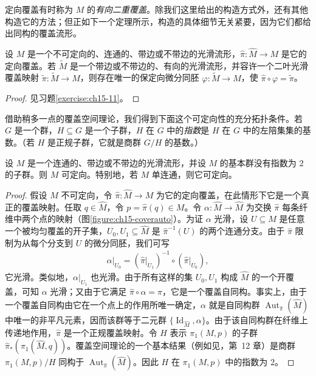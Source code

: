 \documentclass[../../main.tex]{subfiles}
\begin{document}
定向覆盖有时称为 $M$ 的\emph{有向二重覆盖}。除我们这里给出的构造方式外，还有其他构造它的方法；但正如下一个定理所示，构造的具体细节无关紧要，因为它们都给出同构的覆盖流形。

\begin{theorem}[定向覆盖的唯一性]\label{theorem:ch15-covering-uniqueness}
设 $M$ 是一个不可定向的、连通的、带边或不带边的光滑流形，$\widehat\pi:\widehat M\to M$ 是它的定向覆盖。若 $\widetilde M$ 是一个带边或不带边的、有向的光滑流形，并容许一个二叶光滑覆盖映射 $\widetilde\pi:\widetilde M\to M$，则存在唯一的保定向微分同胚 $\varphi:\widetilde M\to\widehat M$，使 $\widehat\pi\circ\varphi=\widetilde\pi$。
\end{theorem}

\begin{proof}
见习题\ref{exercise:ch15-11}。
\end{proof}

借助稍多一点的覆盖空间理论，我们得到下面这个可定向性的充分拓扑条件。若 $G$ 是一个群，$H\subseteq G$ 是一个子群，$H$ 在 $G$ 中的\emph{指数}是 $H$ 在 $G$ 中的左陪集集的基数。（若 $H$ 是正规子群，它就是商群 $G/H$ 的基数。）

\begin{theorem}\label{theorem:ch15-fundamental-group}
设 $M$ 是一个连通的、带边或不带边的光滑流形，并设 $M$ 的基本群没有指数为 $2$ 的子群。则 $M$ 可定向。特别地，若 $M$ 单连通，则它可定向。
\end{theorem}

\begin{proof}
假设 $M$ 不可定向，令 $\widehat\pi:\widehat M\to M$ 为它的定向覆盖，在此情形下它是一个真正的覆盖映射。任取 $q\in\widehat M$，令 $p=\widehat\pi(q)\in M$。令 $\alpha:\widehat M\to\widehat M$ 为交换 $\widehat\pi$ 每条纤维中两个点的映射（图\ref{figure:ch15-coverauto}）。为证 $\alpha$ 光滑，设 $U\subseteq M$ 是任意一个被均匀覆盖的开子集，$U_0,U_1\subseteq\widehat M$ 是 $\widehat\pi^{-1}(U)$ 的两个连通分支。由于 $\widehat\pi$ 限制为从每个分支到 $U$ 的微分同胚，我们可写
\begin{align*}
\alpha|_{U_0}=(\widehat\pi|_{U_1})^{-1}\circ(\widehat\pi|_{U_0}),
\end{align*}
它光滑。类似地，$\alpha|_{U_1}$ 也光滑。由于所有这样的集 $U_0,U_1$ 构成 $\widehat M$ 的一个开覆盖，可知 $\alpha$ 光滑；又由于它满足 $\widehat\pi\circ\alpha=\widehat\pi$，它是一个覆盖自同构。事实上，由于一个覆盖自同构由它在一个点上的作用所唯一确定，$\alpha$ 就是自同构群 $\operatorname{Aut}_{\widehat\pi}(\widehat M)$ 中唯一的非平凡元素，因而该群等于二元群 $\{\operatorname{Id}_{\widehat M},\alpha\}$。由于该自同构群在纤维上传递地作用，$\widehat\pi$ 是一个正规覆盖映射。令 $H$ 表示 $\pi_1(M,p)$ 的子群 $\widehat\pi_*(\pi_1(\widehat M,q))$。覆盖空间理论的一个基本结果（例如见\cite{LeeTM}，第~12 章）是商群 $\pi_1(M,p)/H$ 同构于 $\operatorname{Aut}_{\widehat\pi}(\widehat M)$。因此 $H$ 在 $\pi_1(M,p)$ 中的指数为 $2$。
\end{proof}
\end{document}
